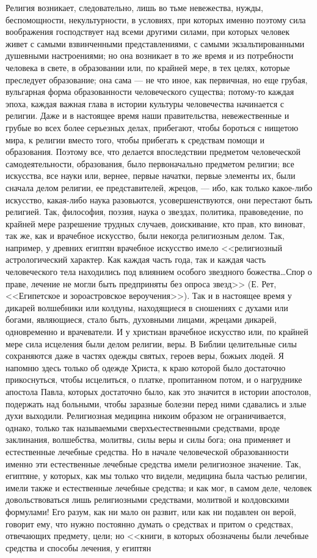\documentclass[12pt]{article}
\begin{document}
Религия возникает, следовательно, лишь во тьме невежества, нужды, беспомощности, некультурности, в условиях, при которых именно поэтому сила воображения господствует над всеми другими силами, при которых человек живет с самыми взвинченными представлениями, с самыми экзальтированными душевными настроениями; но она возникает в то же время и из потребности человека в свете, в образовании или, по крайней мере, в тех целях, которые преследует образование; она сама --- не что иное, как первичная, но еще грубая, вульгарная форма образованности человеческого существа; потому-то каждая эпоха, каждая важная глава в истории культуры человечества начинается с религии. Даже и в настоящее время наши правительства, невежественные и грубые во всех более серьезных делах, прибегают, чтобы бороться с нищетою мира, к религии вместо того, чтобы прибегать к средствам помощи и образования. Поэтому все, что делается впоследствии предметом человеческой самодеятельности, образования, было первоначально предметом религии; все искусства, все науки или, вернее, первые начатки, первые элементы их, были сначала делом религии, ее представителей, жрецов, --- ибо, как только какое-либо искусство, какая-либо наука разовьются, усовершенствуются, они перестают быть религией. Так, философия, поэзия, наука о звездах, политика, правоведение, по крайней мере разрешение трудных случаев, доискивание, кто прав, кто виноват, так же, как и врачебное искусство, были некогда религиозным делом. Так, например, у древних египтян врачебное искусство имело <<религиозный астрологический характер. Как каждая часть года, так и каждая часть человеческого тела находились под влиянием особого звездного божества\dots Спор о праве, лечение не могли быть предприняты без опроса звезд>> (Е. Рет, <<Египетское и зороастровское вероучения>>). Так и в настоящее время у дикарей волшебники или колдуны, находящиеся в сношениях с духами или богами, являющиеся, стало быть, духовными лицами, жрецами дикарей, одновременно и врачеватели. И у христиан врачебное искусство или, по крайней мере сила исцеления были делом религии, веры. В Библии целительные силы сохраняются даже в частях одежды святых, героев веры, божьих людей. Я напомню здесь только об одежде Христа, к краю которой было достаточно прикоснуться, чтобы исцелиться, о платке, пропитанном потом, и о нагруднике апостола Павла, которых достаточно было, как это значится в истории апостолов, подержать над больными, чтобы заразные болезни перед ними сдавались и злые духи выходили. Религиозная медицина никоим образом не ограничивается, однако, только так называемыми сверхъестественными средствами, вроде заклинания, волшебства, молитвы, силы веры и силы бога; она применяет и естественные лечебные средства. Но в начале человеческой образованности именно эти естественные лечебные средства имели религиозное значение. Так, египтяне, у которых, как мы только что видели, медицина была частью религии, имели также и естественные лечебные средства; и как мог, в самом деле, человек довольствоваться лишь религиозными средствами, молитвой и колдовскими формулами! Его разум, как ни мало он развит, или как ни подавлен он верой, говорит ему, что нужно постоянно думать о средствах и притом о средствах, отвечающих предмету, цели; но <<книги, в которых обозначены были лечебные средства и способы лечения, у египтян 
\end{document}
